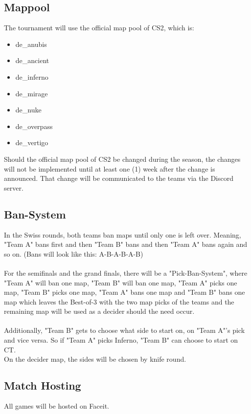 \documentclass{article}
\begin{document}
\subsection{Mappool}
The tournament will use the official map pool of CS2, which is:
\begin{itemize}
    \item de\_anubis
    \item de\_ancient
    \item de\_inferno
    \item de\_mirage
    \item de\_nuke
    \item de\_overpass
    \item de\_vertigo 
\end{itemize}
Should the official map pool of CS2 be changed during the season, the changes will not be implemented until at least one (1) week after
the change is announced. That change will be communicated to the teams via the Discord server.

\subsection{Ban-System}
In the Swiss rounds, both teams ban maps until only one is left over. Meaning, "Team A" bans first and then "Team B" bans and then "Team A"
bans again and so on. (Bans will look like this: A-B-A-B-A-B)\\
\\
\noindent
For the semifinals and the grand finals, there will be a "Pick-Ban-System", where "Team A" will ban one map, "Team B" will ban one map, 
"Team A" picks one map, "Team B" picks one map, "Team A" bans one map and "Team B" bans one map which leaves the Best-of-3 with the 
two map picks of the teams and the remaining map will be used as a decider should the need occur. \\
\\
Additionally, "Team B" gets to choose what side to start on, on "Team A"'s pick and vice versa. So if "Team A" picks Inferno, "Team B" 
can choose to start on CT.\\
On the decider map, the sides will be chosen by knife round. 



\subsection{Match Hosting}
All games will be hosted on Faceit.
\end{document}
